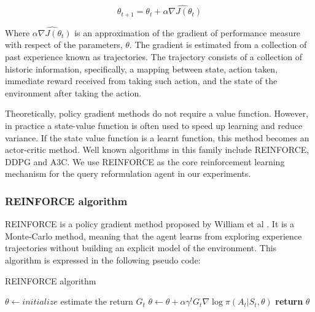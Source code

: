 \begin{equation}
    \theta_{t+1} = \theta_t +  \widehat{\alpha \nabla J(\theta_t)}
\end{equation}

Where $\widehat{\alpha \nabla J(\theta_t)}$ is an approximation of the gradient of performance measure with respect of the parameters, $\theta$. The gradient is estimated from a collection of past experience known as trajectories. The trajectory consists of a collection of historic information, specifically, a mapping between state, action taken, immediate reward received from taking such action, and the state of the environment after taking the action.

Theoretically, policy gradient methods do not require a value function. However, in practice a state-value function is often used to speed up learning and reduce variance. If the state value function is a learnt function, this method becomes an actor-critic method. Well known algorithms in this family include REINFORCE, DDPG\cite{lillicrap2015continuous} and A3C\cite{mnih2016asynchronous}. We use REINFORCE as the core reinforcement learning mechanism for the query reformulation agent in our experiments.


\subsubsection{REINFORCE algorithm} 

REINFORCE is a policy gradient method proposed by William et al \cite{williams1992simple}. It is a Monte-Carlo method, meaning that the agent learns from exploring experience trajectories without building an explicit model of the environment. 
This algorithm is expressed in the following pseudo code:

\begin{algorithm}[H]
	\caption{REINFORCE algorithm}\label{alg:REINFORCE}
	\begin{algorithmic}[1]
		\State $\theta\gets initialize$
		\State estimate the return $G_t$ 
		\State $\theta \gets \theta + \alpha \gamma^tG_t \nabla\log \pi(A_t|S_t,\theta)$
		\EndFor
		\EndFor
		\State \textbf{return} $\theta$  
		\EndProcedure
	\end{algorithmic}
\end{algorithm}


